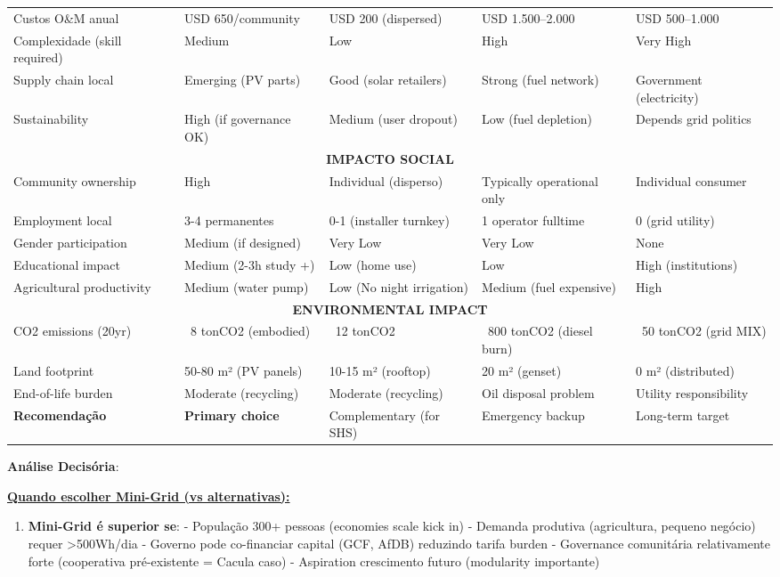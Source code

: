 \documentclass[12pt, a4paper]{article}
\begin{document}
{{{{{{{{{{{{\begin{table}[H]
\begin{tabular}{|l|l|l|l|l|}
\hline
Custos O\&M anual & USD 650/community & USD 200 (dispersed) & USD 1.500–2.000 & USD 500–1.000 \\
Complexidade (skill required) & Medium & Low & High & Very High \\
Supply chain local & Emerging (PV parts) & Good (solar retailers) & Strong (fuel network) & Government (electricity) \\
Sustainability & High (if governance OK) & Medium (user dropout) & Low (fuel depletion) & Depends grid politics \\
\hline
\multicolumn{5}{|c|}{\textbf{IMPACTO SOCIAL}} \\
\hline
Community ownership & High & Individual (disperso) & Typically operational only & Individual consumer \\
Employment local & 3-4 permanentes & 0-1 (installer turnkey) & 1 operator fulltime & 0 (grid utility) \\
Gender participation & Medium (if designed) & Very Low & Very Low & None \\
Educational impact & Medium (2-3h study +) & Low (home use) & Low & High (institutions) \\
Agricultural productivity & Medium (water pump) & Low (No night irrigation) & Medium (fuel expensive) & High \\
\hline
\multicolumn{5}{|c|}{\textbf{ENVIRONMENTAL IMPACT}} \\
\hline
CO2 emissions (20yr) & ~8 tonCO2 (embodied) & ~12 tonCO2 & ~800 tonCO2 (diesel burn) & ~50 tonCO2 (grid MIX) \\
Land footprint & 50-80 m² (PV panels) & 10-15 m² (rooftop) & 20 m² (genset) & 0 m² (distributed) \\
End-of-life burden & Moderate (recycling) & Moderate (recycling) & Oil disposal problem & Utility responsibility \\
\hline
\textbf{Recomendação} & \textbf{Primary choice} & Complementary (for SHS) & Emergency backup & Long-term target \\
\hline
\end{tabular}
\end{table}

\textbf{Análise Decisória}:

\underline{\textbf{Quando escolher Mini-Grid (vs alternativas):}}
\begin{enumerate}
\item \textbf{Mini-Grid é superior se}:
   - População 300+ pessoas (economies scale kick in)
   - Demanda produtiva (agricultura, pequeno negócio) requer >500Wh/dia
   - Governo pode co-financiar capital (GCF, AfDB) reduzindo tarifa burden
   - Governance comunitária relativamente forte (cooperativa pré-existente = Cacula caso)
   - Aspiration crescimento futuro (modularity importante)


\end{enumerate}}}}}}}}}}}}}
\end{document}
